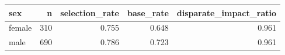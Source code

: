 \begin{tabular}{lrrrr}
\toprule
sex & n & selection_rate & base_rate & disparate_impact_ratio \\
\midrule
female & 310 & 0.755 & 0.648 & 0.961 \\
male & 690 & 0.786 & 0.723 & 0.961 \\
\bottomrule
\end{tabular}

